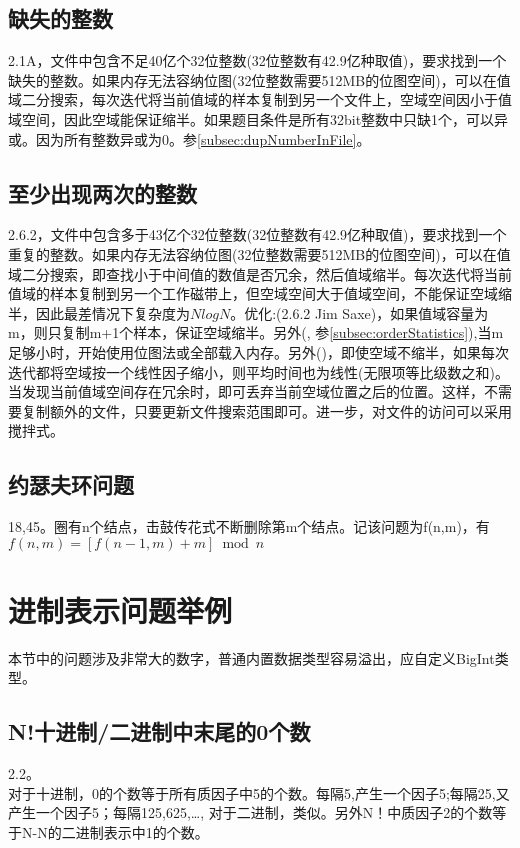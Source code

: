 \subsection{缺失的整数}
\cite{pp}2.1A，文件中包含不足40亿个32位整数(32位整数有42.9亿种取值)，要求找到一个缺失的整数。如果内存无法容纳位图(32位整数需要512MB的位图空间)，可以在值域二分搜索，每次迭代将当前值域的样本复制到另一个文件上，空域空间因小于值域空间，因此空域能保证缩半。如果题目条件是所有32bit整数中只缺1个，可以异或。因为所有整数异或为0。参\ref{subsec:dupNumberInFile}。

\subsection{至少出现两次的整数}
\cite{pp}2.6.2，文件中包含多于43亿个32位整数(32位整数有42.9亿种取值)，要求找到一个重复的整数。如果内存无法容纳位图(32位整数需要512MB的位图空间)，可以在值域二分搜索，即查找小于中间值的数值是否冗余，然后值域缩半。每次迭代将当前值域的样本复制到另一个工作磁带上，但空域空间大于值域空间，不能保证空域缩半，因此最差情况下复杂度为$NlogN$。优化:(\cite{pp}2.6.2 Jim Saxe)，如果值域容量为m，则只复制m+1个样本，保证空域缩半。另外(\cite{self}, 参\ref{subsec:orderStatistics}),当m足够小时，开始使用位图法或全部载入内存。另外(\cite{self})，即使空域不缩半，如果每次迭代都将空域按一个线性因子缩小，则平均时间也为线性(无限项等比级数之和)。当发现当前值域空间存在冗余时，即可丢弃当前空域位置之后的位置。这样，不需要复制额外的文件，只要更新文件搜索范围即可。进一步，对文件的访问可以采用搅拌式。

\label{subsec:dupNumberInFile}

\subsection{约瑟夫环问题}
\cite{ms100}18,\cite{sword}45。圈有n个结点，击鼓传花式不断删除第m个结点。记该问题为f(n,m)，有 $f(n,m)=[f(n-1,m)+m]\bmod n$




\section{进制表示问题举例}
本节中的问题涉及非常大的数字，普通内置数据类型容易溢出，应自定义BigInt类型。
\subsection{N!十进制/二进制中末尾的0个数}
\cite{bop}2.2。\\
对于十进制，0的个数等于所有质因子中5的个数。每隔5,产生一个因子5;每隔25,又产生一个因子5；每隔125,625,\ldots,
对于二进制，类似。另外N！中质因子2的个数等于N-N的二进制表示中1的个数。
